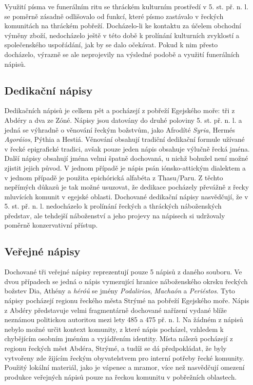 Využití písma ve funerálním ritu se thráckém kulturním prostředí v 5. st. př. n. l. se poměrně zásadně odlišovalo od funkcí, které písmo zastávalo v řeckých komunitách na thráckém pobřeží. Docházelo-li ke kontaktu za účelem obchodní výměny zboží, nedocházelo ještě v této době k prolínání kulturních zvyklostí a společenského uspořádání, jak by se dalo očekávat. Pokud k nim přesto docházelo, výrazně se ale neprojevily na výsledné podobě a využití funerálních nápisů.

\subsection[dedikační-nápisy-1]{Dedikační nápisy}

Dedikačních nápisů je celkem pět a pocházejí z pobřeží Egejského moře: tři z Abdéry a dva ze Zóné. Nápisy jsou datovány do druhé poloviny 5. st. př. n. l. a jedná se výhradně o věnování řeckým božstvům, jako Afrodíté {\em Syria}, Hermés {\em Agoráios}, Pýthia a Hestiá. Věnování obsahují tradiční dedikační formule užívané v řecké epigrafické tradici, avšak pouze jeden nápis obsahuje výlučně řecká jména. Další nápisy obsahují jména velmi špatně dochovaná, u nichž bohužel není možné zjistit jejich původ. V jednom případě je nápis psán iónsko-attickým dialektem a v jednom případě je použita epichórická alfabéta z Thasu/Paru. Z těchto nepřímých důkazů je tak možné usuzovat, že dedikace pocházely převážně z řecky mluvících komunit v egejské oblasti. Dochované dedikační nápisy nasvědčují, že v 5. st. př. n. l. nedocházelo k prolínání řeckých a thráckých náboženských představ, ale tehdejší náboženství a jeho projevy na nápisech si udržovaly poměrně konzervativní přístup.

\subsection[veřejné-nápisy-1]{Veřejné nápisy}

Dochované tři veřejné nápisy reprezentují pouze 5  nápisů z daného souboru. Ve dvou případech se jedná o nápis vymezující hranice náboženského okrsku řeckých božstev Dia, Athény a {\em héróů} se jmény {\em Podalirios}, {\em Machaón} a {\em Periéstos}. Tyto nápisy pocházejí regionu řeckého města Strýmé na pobřeží Egejského moře. Nápis z Abdéry představuje velmi fragmentárně dochované nařízení vydané blíže neznámou politickou autoritou mezi lety 485 a 475 př. n. l. Na žádném z nápisů nebylo možné určit kontext komunity, z které nápis pocházel, vzhledem k chybějícím osobním jménům a vyjádřením identity. Místa nálezů pocházejí z regionu řeckých měst Abdéra, Strýmé, a tudíž se dá předpokládat, že byly vytvořeny zde žijícím řeckým obyvatelstvem pro interní potřeby řecké komunity. Použitý lokální materiál, jako je vápenec a mramor, více než nasvědčují omezení produkce veřejných nápisů pouze na řeckou komunitu v pobřežních oblastech.

